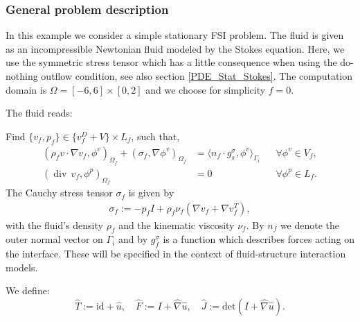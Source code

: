 \subsubsection{General problem description}
   
In this example we consider a simple stationary FSI problem. The fluid
is given as an incompressible Newtonian fluid modeled by the Stokes equation. Here, we use the symmetric stress tensor which has a little consequence when using the do-nothing outflow condition, see also section \ref{PDE_Stat_Stokes}.
The computation domain is $\Omega = [-6,6]\times [0,2]$ and we choose for simplicity $f=0$. 

The fluid reads: 
\begin{Problem}
 Find $\{v_f,p_f\} \in \{ v_f^D + V\} \times L_f$, such that,
  \begin{equation*}
    \begin{aligned} 
      (\rho_f v\cdot\nabla v_f,\phi^v)_{\Omega_f} +
      (\sigma_f,\nabla\phi^v)_{\Omega_f} 
      &= \langle n_f\cdot g_s^\sigma ,\phi^v \rangle_{\Gamma_i}
      &&\forall \phi^v\in V_f, \\
      (\operatorname{div}\, v_f,\phi^p)_{\Omega_f} &= 0
      &&\forall\phi^p\in L_f.
    \end{aligned}
  \end{equation*}
  The Cauchy stress tensor $\sigma_f$ is given by 
  \begin{eqnarray}
    \sigma_f:=-p_f I + \rho_f\nu_f (\nabla v_f+\nabla v_f^T),
  \end{eqnarray}
  with the fluid's density $\rho_f$  and the kinematic viscosity
  $\nu_f$. By $n_f$ we denote the outer normal vector on $\Gamma_i$
  and by $g^\sigma_f$ is a function which describes forces acting on the interface. These
  will be specified in the context of fluid-structure interaction
  models.  
\end{Problem}
We define:
\begin{equation*}
\hat T:=\text{id}+\hat u,\quad
\hat F:=I+\hat\nabla \hat u,\quad
\hat J:=\text{det}(I+\hat\nabla \hat u).
\end{equation*}


